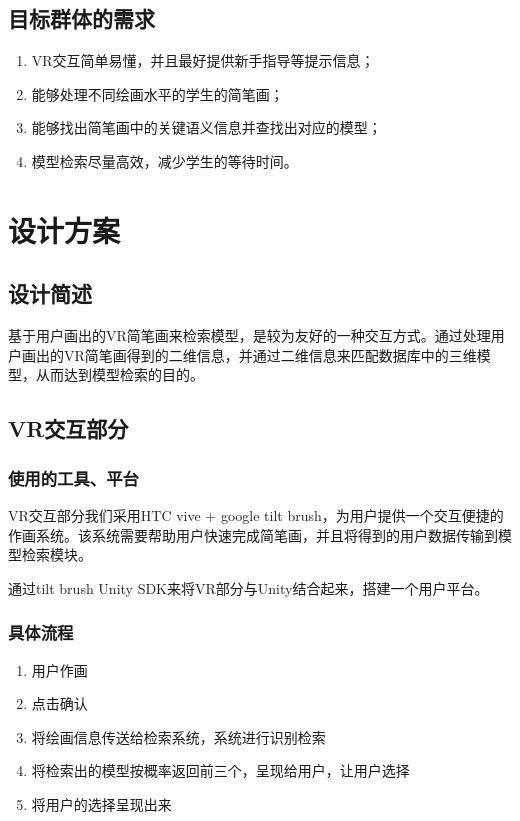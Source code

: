 \documentclass{article}
\begin{document}
\subsection{目标群体的需求}
\begin{enumerate}
    \item VR交互简单易懂，并且最好提供新手指导等提示信息；
    \item 能够处理不同绘画水平的学生的简笔画；
    \item 能够找出简笔画中的关键语义信息并查找出对应的模型；
    \item 模型检索尽量高效，减少学生的等待时间。
\end{enumerate}

\section{设计方案}
\subsection{设计简述}
基于用户画出的VR简笔画来检索模型，是较为友好的一种交互方式。通过处理用户画出的VR简笔画得到的二维信息，并通过二维信息来匹配数据库中的三维模型，从而达到模型检索的目的。  

\subsection{VR交互部分}
\subsubsection{使用的工具、平台}
VR交互部分我们采用HTC vive + google tilt brush，为用户提供一个交互便捷的作画系统。该系统需要帮助用户快速完成简笔画，并且将得到的用户数据传输到模型检索模块。

通过tilt brush Unity SDK来将VR部分与Unity结合起来，搭建一个用户平台。

\subsubsection{具体流程}
\begin{enumerate}
    \item 用户作画
    \item 点击确认
    \item 将绘画信息传送给检索系统，系统进行识别检索
    \item 将检索出的模型按概率返回前三个，呈现给用户，让用户选择
    \item 将用户的选择呈现出来
\end{enumerate}
\end{document}
